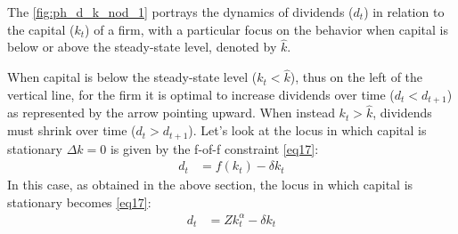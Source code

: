 \documentclass[12pt]{report}
\begin{document}
The \ref{fig:ph_d_k_nod_1} portrays the dynamics of dividends (\(d_t\)) in relation to the capital (\(k_t\)) of a firm, with a
particular focus on the behavior when capital is below or above the steady-state level,  denoted by \(\hat{k}\).

When capital is below the steady-state level (\(k_t < \hat{k}\)), thus on the left of the vertical line, for the
firm it is optimal to increase dividends over time (\(d_t<d_{t+1}\)) as represented by the arrow pointing upward. When instead
\(k_t > \hat{k}\), dividends must shrink over time (\(d_t>d_{t+1}\)).
Let's look at the locus in which capital is stationary \(\Delta k = 0 \) is given by the f-of-f constraint \ref{eq17}:
\begin{align}
    d_t & = f(k_t) - \delta k_t
\end{align}
In this case, as obtained in the above section, the locus in which capital is stationary becomes \ref{eq17}:
\begin{align}
    d_t &=Z k^{\alpha}_t-\delta k_t
\end{align}
\end{document}
